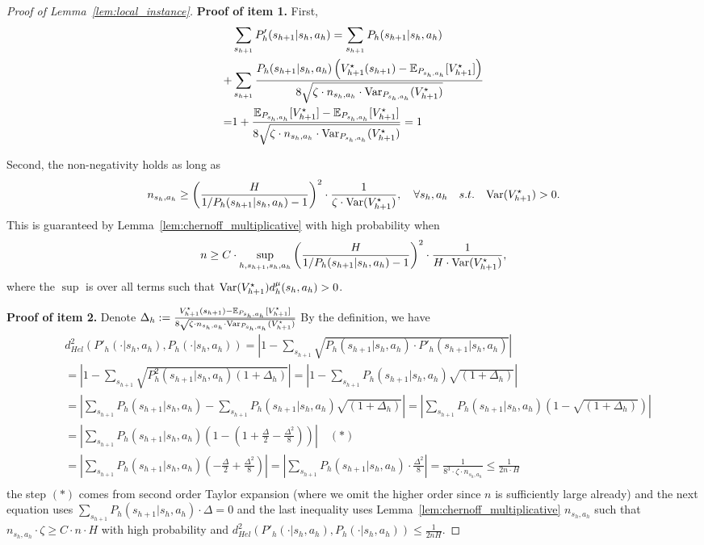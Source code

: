 \begin{proof}[Proof of Lemma~\ref{lem:local_instance}]
\textbf{Proof of item 1.}	First,
\begin{align*}
&\sum_{s_{h+1}}P'_h(s_{h+1}|s_h,a_h)=\sum_{s_{h+1}}P_h(s_{h+1}|s_h,a_h)\\
+&\sum_{s_{h+1}}\frac{P_h(s_{h+1}|s_h,a_h)\left(V_{h+1}^\star(s_{h+1})-\mathbb{E}_{P_{s_h,a_h}}[V_{h+1}^\star]\right)}{8\sqrt{\zeta\cdot n_{s_h,a_h}\cdot \mathrm{Var}_{P_{s_h,a_h}}(V_{h+1}^\star)}}\\
=&1+\frac{\mathbb{E}_{P_{s_h,a_h}}[V_{h+1}^\star]-\mathbb{E}_{P_{s_h,a_h}}[V_{h+1}^\star]}{8\sqrt{\zeta\cdot n_{s_h,a_h}\cdot \mathrm{Var}_{P_{s_h,a_h}}(V_{h+1}^\star)}}=1\\
\end{align*}

Second, the non-negativity holds as long as
\[
n_{s_h,a_h}\geq \left(\frac{H}{1/P_h(s_{h+1}|s_h,a_h)-1}\right)^2\cdot\frac{1}{\zeta\cdot \mathrm{Var}(V^\star_{h+1})},\quad \forall s_h,a_h \quad s.t. \quad \mathrm{Var}(V^\star_{h+1})>0.
\]
This is guaranteed by Lemma~\ref{lem:chernoff_multiplicative} with high probability when 
\[
n\geq C\cdot \sup_{h,s_{h+1},s_h,a_h} \left(\frac{H}{1/P_h(s_{h+1}|s_h,a_h)-1}\right)^2\cdot\frac{1}{H\cdot\mathrm{Var}(V^\star_{h+1})},
\]
where the $\sup$ is over all terms such that $\mathrm{Var}(V^\star_{h+1})d^\mu_h(s_h,a_h)>0$.

\textbf{Proof of item 2.}
Denote $\Delta_h:=\frac{V_{h+1}^\star(s_{h+1})-\mathbb{E}_{P_{s_h,a_h}}[V_{h+1}^\star]}{8\sqrt{\zeta\cdot n_{s_h,a_h}\cdot \mathrm{Var}_{P_{s_h,a_h}}(V_{h+1}^\star)}}$
By the definition, we have 
\begin{align*}
&d^2_{Hel}(P'_h(\cdot|s_h,a_h),P_h(\cdot|s_h,a_h))=\left\lvert 1-\sum_{s_{h+1}}\sqrt{P_h(s_{h+1}|s_h,a_h)\cdot P'_h(s_{h+1}|s_h,a_h)}\right\rvert \\
&=\left\lvert 1-\sum_{s_{h+1}}\sqrt{P_h^2(s_{h+1}|s_h,a_h)(1+\Delta_h)} \right\rvert=\left\lvert 1-\sum_{s_{h+1}}P_h(s_{h+1}|s_h,a_h)\sqrt{(1+\Delta_h)} \right\rvert\\
&=\left\lvert \sum_{s_{h+1}}P_h(s_{h+1}|s_h,a_h)-\sum_{s_{h+1}}P_h(s_{h+1}|s_h,a_h)\sqrt{(1+\Delta_h)} \right\rvert=\left\lvert \sum_{s_{h+1}}P_h(s_{h+1}|s_h,a_h)\left(1-\sqrt{(1+\Delta_h)} \right)\right\rvert\\
&=\left\lvert \sum_{s_{h+1}}P_h(s_{h+1}|s_h,a_h)\left(1-\left(1+\frac{\Delta}{2}-\frac{\Delta^2}{8}\right) \right)\right\rvert \quad (*)\\
&=\left\lvert \sum_{s_{h+1}}P_h(s_{h+1}|s_h,a_h)\left(-\frac{\Delta}{2}+\frac{\Delta^2}{8}\right) \right\rvert =\left\lvert \sum_{s_{h+1}}P_h(s_{h+1}|s_h,a_h)\cdot\frac{\Delta^2}{8} \right\rvert =\frac{1}{8^3\cdot \zeta\cdot n_{s_h,a_h}  }\leq \frac{1}{2n\cdot H}\\
\end{align*}
the step $(*)$ comes from second order Taylor expansion (where we omit the higher order since $n$ is sufficiently large already) and the next equation uses $\sum_{s_{h+1}} P_h(s_{h+1}|s_h,a_h)\cdot \Delta=0$ and the last inequality uses Lemma~\ref{lem:chernoff_multiplicative} $n_{s_h,a_h}$ such that $n_{s_h,a_h}\cdot\zeta\geq C \cdot n\cdot H$ with high probability and $d^2_{Hel}(P'_h(\cdot|s_h,a_h),P_h(\cdot|s_h,a_h))\leq \frac{1}{2nH}$.


\end{proof}

